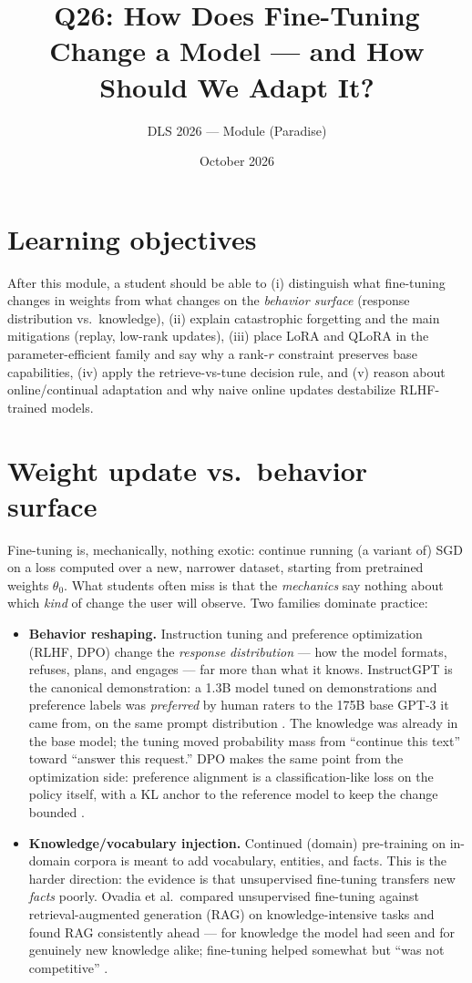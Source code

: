 \documentclass[11pt]{article}
\title{Q26: How Does Fine-Tuning Change a Model --- and How Should We Adapt It?}
\author{DLS 2026 --- Module (Paradise)}
\date{October 2026}
\begin{document}
\maketitle

\section*{Learning objectives}
After this module, a student should be able to (i) distinguish what fine-tuning changes in weights from what changes on the \emph{behavior surface} (response distribution vs.\ knowledge), (ii) explain catastrophic forgetting and the main mitigations (replay, low-rank updates), (iii) place LoRA and QLoRA in the parameter-efficient family and say why a rank-$r$ constraint preserves base capabilities, (iv) apply the retrieve-vs-tune decision rule, and (v) reason about online/continual adaptation and why naive online updates destabilize RLHF-trained models.

\section{Weight update vs.\ behavior surface}
Fine-tuning is, mechanically, nothing exotic: continue running (a variant of) SGD on a loss computed over a new, narrower dataset, starting from pretrained weights $\theta_0$. What students often miss is that the \emph{mechanics} say nothing about which \emph{kind} of change the user will observe. Two families dominate practice:

\begin{itemize}[noitemsep]
  \item \textbf{Behavior reshaping.} Instruction tuning and preference optimization (RLHF, DPO) change the \emph{response distribution} --- how the model formats, refuses, plans, and engages --- far more than what it knows. InstructGPT is the canonical demonstration: a 1.3B model tuned on demonstrations and preference labels was \emph{preferred} by human raters to the 175B base GPT-3 it came from, on the same prompt distribution \cite{ouyang2022training}. The knowledge was already in the base model; the tuning moved probability mass from ``continue this text'' toward ``answer this request.'' DPO makes the same point from the optimization side: preference alignment is a classification-like loss on the policy itself, with a KL anchor to the reference model to keep the change bounded \cite{rafailov2023direct}.
  \item \textbf{Knowledge/vocabulary injection.} Continued (domain) pre-training on in-domain corpora is meant to add vocabulary, entities, and facts. This is the harder direction: the evidence is that unsupervised fine-tuning transfers new \emph{facts} poorly. Ovadia et al.\ compared unsupervised fine-tuning against retrieval-augmented generation (RAG) on knowledge-intensive tasks and found RAG consistently ahead --- for knowledge the model had seen and for genuinely new knowledge alike; fine-tuning helped somewhat but ``was not competitive'' \cite{ovadia2024fine}.
\end{itemize}
\end{document}
